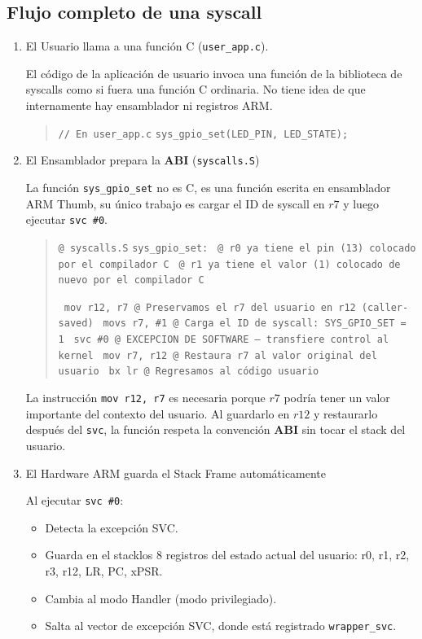 \documentclass[12pt,letterpaper]{article}
\begin{document}
\subsection*{Flujo completo de una syscall}

\begin{enumerate}[label=Paso \arabic*.]
\item El Usuario llama a una función C (\texttt{user\_app.c}).
  
  El código de la aplicación de usuario invoca una función de la biblioteca de syscalls como si fuera una función C ordinaria. No tiene idea de que internamente hay ensamblador ni registros ARM.
  
  \begin{quote}
    \texttt{// En user\_app.c}
    \texttt{sys\_gpio\_set(LED\_PIN, LED\_STATE);}
  \end{quote}
  
\item El Ensamblador prepara la \textbf{ABI} (\texttt{syscalls.S})
  
  La función \texttt{sys\_gpio\_set} no es C, es una función escrita en ensamblador ARM Thumb, su único trabajo es cargar el ID de syscall en $r7$ y luego ejecutar \texttt{svc \#0}.
  
  \begin{quote}
    \texttt{@ syscalls.S}
    \texttt{sys\_gpio\_set:}
    \texttt{    @ r0 ya tiene el pin (13) colocado por el compilador C}
    \texttt{    @ r1 ya tiene el valor (1) colocado de nuevo por el compilador C}
    
    \texttt{    mov r12, r7   @ Preservamos el r7 del usuario en r12 (caller-saved)}
    \texttt{    movs r7, \#1  @ Carga el ID de syscall: SYS\_GPIO\_SET = 1}
    \texttt{    svc \#0       @ EXCEPCION DE SOFTWARE — transfiere control al kernel}
    \texttt{    mov r7, r12   @ Restaura r7 al valor original del usuario}
    \texttt{    bx lr         @ Regresamos al código usuario}
  \end{quote}
  
  La instrucción \texttt{mov r12, r7} es necesaria porque $r7$ podría tener un valor importante del contexto del usuario. Al guardarlo en $r12$ y restaurarlo después del \texttt{svc}, la función respeta la convención \textbf{ABI} sin tocar el stack del usuario.
  
\item El Hardware ARM guarda el Stack Frame automáticamente
  
  Al ejecutar \texttt{svc \#0}:
  \begin{itemize}
  \item Detecta la excepción SVC.
  \item Guarda en el stacklos 8 registros del estado actual del usuario: r0, r1, r2, r3, r12, LR, PC, xPSR.
  \item Cambia al modo Handler (modo privilegiado).
  \item Salta al vector de excepción SVC, donde está registrado \texttt{wrapper\_svc}.
  \end{itemize}
  

\end{enumerate}
\end{document}
